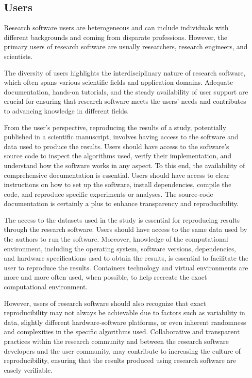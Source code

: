 \subsection{Users}

Research software users are heterogeneous and can include individuals with different backgrounds and coming from disparate professions. However, the primary users of research software are usually researchers, research engineers, and scientists. 

The diversity of users highlights the interdisciplinary nature of research software, which often spans various scientific fields and application domains. Adequate documentation, hands-on tutorials, and the steady availability of user support are crucial for ensuring that research software meets the users' needs and contributes to advancing knowledge in different fields.  

From the user's perspective, reproducing the results of a study, potentially published in a scientific manuscript, involves having access to the software and data used to produce the results. 
Users should have access to the software's source code to inspect the algorithms used, verify their implementation, and understand how the software works in any aspect.
To this end, the availability of comprehensive documentation is essential. Users should have access to clear instructions on how to set up the software, install dependencies, compile the code, and reproduce specific experiments or analyses. The source-code documentation is certainly a plus to enhance transparency and reproducibility.

The access to the datasets used in the study is essential for reproducing results through the research software. Users should have access to the same data used by the authors to run the software. Moreover, knowledge of the computational environment, including the operating system, software versions, dependencies, and hardware specifications used to obtain the results, is essential to facilitate the user to reproduce the results. Containers technology and virtual environments are more and more often used, when possible, to help recreate the exact computational environment.

However, users of research software should also recognize that exact reproducibility may not always be achievable due to factors such as variability in data, slightly different hardware-software platforms, or even inherent randomness and complexities in the specific algorithms used. 
Collaborative and transparent practices within the research community and between the research software developers and the user community, may contribute to increasing the culture of reproducibility, ensuring that the results produced using research software are easely verifiable.


